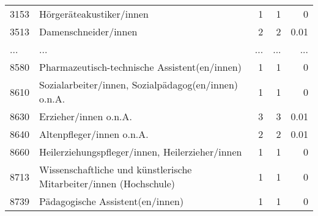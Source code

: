 \begin{longtable}{lXrrr}
        3153 & \multicolumn{1}{X}{Hörgeräteakustiker/innen} & %
          \num{1} &
          \num[round-mode=places,round-precision=2]{1} &
          \num[round-mode=places,round-precision=2]{0} \\
        3513 & \multicolumn{1}{X}{Damenschneider/innen} & %
          \num{2} &
          \num[round-mode=places,round-precision=2]{2} &
          \num[round-mode=places,round-precision=2]{0,01} \\
       ... & ... & ... & ... & ... \\
        8580 & \multicolumn{1}{X}{Pharmazeutisch-technische Assistent(en/innen)} & %
          \num{1} &
          \num[round-mode=places,round-precision=2]{1} &
          \num[round-mode=places,round-precision=2]{0} \\

        8610 & \multicolumn{1}{X}{Sozialarbeiter/innen, Sozialpädagog(en/innen) o.n.A.} & %
          \num{1} &
          \num[round-mode=places,round-precision=2]{1} &
          \num[round-mode=places,round-precision=2]{0} \\

        8630 & \multicolumn{1}{X}{Erzieher/innen o.n.A.} & %
          \num{3} &
          \num[round-mode=places,round-precision=2]{3} &
          \num[round-mode=places,round-precision=2]{0,01} \\

        8640 & \multicolumn{1}{X}{Altenpfleger/innen o.n.A.} & %
          \num{2} &
          \num[round-mode=places,round-precision=2]{2} &
          \num[round-mode=places,round-precision=2]{0,01} \\

        8660 & \multicolumn{1}{X}{Heilerziehungspfleger/innen, Heilerzieher/innen} & %
          \num{1} &
          \num[round-mode=places,round-precision=2]{1} &
          \num[round-mode=places,round-precision=2]{0} \\

        8713 & \multicolumn{1}{X}{Wissenschaftliche und künstlerische Mitarbeiter/innen (Hochschule)} & %
          \num{1} &
          \num[round-mode=places,round-precision=2]{1} &
          \num[round-mode=places,round-precision=2]{0} \\

        8739 & \multicolumn{1}{X}{Pädagogische Assistent(en/innen)} & %
          \num{1} &
          \num[round-mode=places,round-precision=2]{1} &
          \num[round-mode=places,round-precision=2]{0} \\


\end{longtable}
